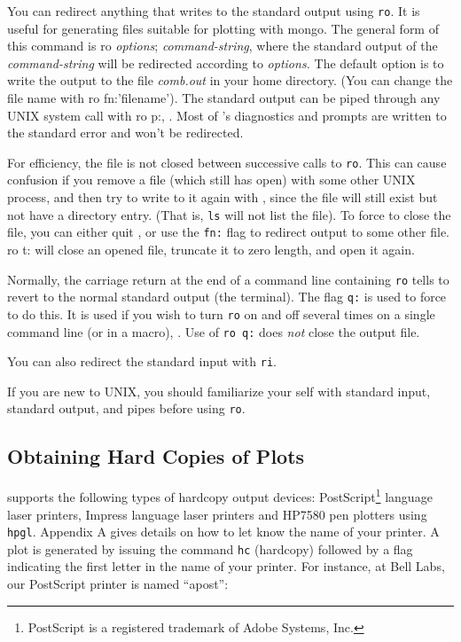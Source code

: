 You can redirect anything that \COMB writes to the standard output using
{\tt ro}. It is useful for generating files suitable for plotting with 
{\twlsc mongo}.  The general form of this command is {\us ro {\it options}; 
{\it command-string}}, where the standard output of the {\it command-string\/} 
will be redirected according to {\it options.} 
The default option is to write the output to the file {\sl comb.out\/}
in your home directory. (You can change the file name with {\us ro fn:'filename'}). 
The standard output can be piped through any UNIX system call with {\us ro p:}, 
. 
Most of \C's diagnostics and prompts are written to the standard error 
and won't be redirected. 
 
For efficiency, the file is not closed between successive calls
to {\tt ro}. This can cause confusion if you remove a file (which \COMB still has
open) with some other UNIX process, and then try to write to it again with \C, 
since the file will still exist but not have a directory entry. (That is,
{\tt ls} will not list the file). 
To force \COMB to close the file, you can either quit \C, or use the {\tt fn:}
flag to redirect output to some other file. {\us ro t:} will close
an opened file, truncate it to zero length, and open it again.

Normally, the carriage return at the end of a command line containing 
{\tt ro} tells \COMB to revert to the normal standard output (\ie the terminal).
The flag {\tt q:} is used to force \COMB to do this.
It is used if you wish to turn {\tt ro} on and off
several times on a single command line (or in a macro), 
. Use of {\tt ro q:} 
does {\it not} close the output file.

You can also redirect the standard input with {\tt ri}.
 
If you are new to UNIX, you should familiarize your self with standard input,
standard output, and pipes before using {\tt ro}.

\subsection{Obtaining Hard Copies of Plots}

\COMB supports the following types of hardcopy output devices: 
PostScript\footnote{PostScript is a registered trademark of Adobe Systems, Inc.} 
language laser printers, Impress language laser printers and HP7580 pen plotters  
using {\tt hpgl}. Appendix A gives details on how to let \COMB know 
the name of your printer. A plot is generated by issuing the 
command {\tt hc} (hardcopy) followed by a flag indicating the first letter 
in the name of your printer. For instance, at Bell Labs, our PostScript printer
is named ``apost'':

